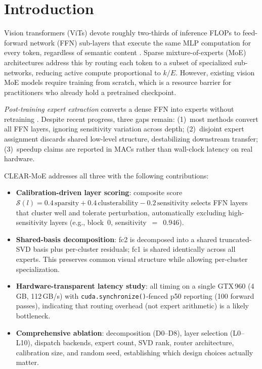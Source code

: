 \documentclass[conference]{IEEEtran}
\begin{document}
\section{Introduction}
\label{sec:intro}

Vision transformers (ViTs) \cite{dosovitskiy2021vit} devote roughly two-thirds of inference FLOPs to feed-forward network (FFN) sub-layers that execute the same MLP computation for every token, regardless of semantic content \cite{riquelme2021vmoe}. Sparse mixture-of-experts (MoE) architectures \cite{shazeer2017outrageously} address this by routing each token to a subset of specialized sub-networks, reducing active compute proportional to $k/E$. However, existing vision MoE models \cite{riquelme2021vmoe,chen2023adamvmoe} require training from scratch, which is a resource barrier for practitioners who already hold a pretrained checkpoint.

\emph{Post-training expert extraction} converts a dense FFN into experts without retraining \cite{zhang2022moefication,d2dmoe2024,berisha2025cvpr}. Despite recent progress, three gaps remain: (1)~most methods convert all FFN layers, ignoring sensitivity variation across depth; (2)~disjoint expert assignment discards shared low-level structure, destabilizing downstream transfer; (3)~speedup claims are reported in MACs rather than wall-clock latency on real hardware.

CLEAR-MoE addresses all three with the following contributions:

\begin{itemize}[leftmargin=*,noitemsep]
\item \textbf{Calibration-driven layer scoring}: composite score $\mathcal{S}(l) = 0.4\,\text{sparsity} + 0.4\,\text{clusterability} - 0.2\,\text{sensitivity}$ selects FFN layers that cluster well and tolerate perturbation, automatically excluding high-sensitivity layers (e.g., block~0, sensitivity~$=$~0.946).

\item \textbf{Shared-basis decomposition}: fc2 is decomposed into a shared truncated-SVD basis plus per-cluster residuals; fc1 is shared identically across all experts. This preserves common visual structure while allowing per-cluster specialization.

\item \textbf{Hardware-transparent latency study}: all timing on a single GTX\,960 (4\,GB, 112\,GB/s) with \texttt{cuda.synchronize()}-fenced p50 reporting (100 forward passes), indicating that routing overhead (not expert arithmetic) is a likely bottleneck.

\item \textbf{Comprehensive ablation}: decomposition (D0--D8), layer selection (L0--L10), dispatch backends, expert count, SVD rank, router architecture, calibration size, and random seed, establishing which design choices actually matter.
\end{itemize}
\end{document}

